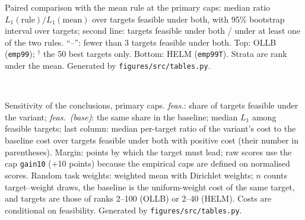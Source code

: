 \documentclass{article}
\begin{document}
\begin{table}[h]
\caption{Paired comparison with the mean rule at the primary caps: median ratio $L_1(\text{rule})/L_1(\text{mean})$ over targets feasible under both, with 95\% bootstrap interval over targets; second line: targets feasible under both / under at least one of the two rules. ``--'': fewer than 3 targets feasible under both. Top: OLLB (\texttt{emp99}); $^\dagger$ the 50 best targets only. Bottom: HELM (\texttt{emp99T}). Strata are rank under the mean. Generated by \texttt{figures/src/tables.py}.}
\label{tab:T5}
\centering\scriptsize
\resizebox{\linewidth}{!}{}\\[4pt]
\resizebox{\linewidth}{!}{}
\end{table}

\begin{table}[h]
\caption{Sensitivity of the conclusions, primary caps. \emph{feas.}: share of targets feasible under the variant; \emph{feas.\ (base)}: the same share in the baseline; median $L_1$ among feasible targets; last column: median per-target ratio of the variant's cost to the baseline cost over targets feasible under both with positive cost (their number in parentheses). Margin: points by which the target must lead; raw scores use the cap \texttt{gain10} (+10 points) because the empirical caps are defined on normalised scores. Random task weights: weighted mean with Dirichlet weights; $n$ counts target--weight draws, the baseline is the uniform-weight cost of the same target, and targets are those of ranks 2--100 (OLLB) or 2--40 (HELM). Costs are conditional on feasibility. Generated by \texttt{figures/src/tables.py}.}
\label{tab:T6}
\centering\scriptsize
\resizebox{\linewidth}{!}{}
\end{table}
\end{document}
